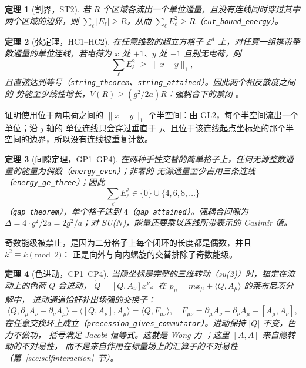 \documentclass[aps,prd,preprint,superscriptaddress,amsmath,amssymb]{revtex4-2}
\newtheorem{theorem}{定理}[section]
\begin{document}
\begin{theorem}[割界，ST2]
若 $R$ 个区域各流出一个单位通量，且没有连线同时穿过其中两个区域的边界，则
$\sum_\ell|E_\ell|\ge R$，从而 $\sum_\ell E_\ell^2\ge R$（\texttt{cut\_bound\_energy}）。
\end{theorem}

\begin{theorem}[弦定理，HC1--HC2]
在任意维数的超立方格子 $\mathbb{Z}^d$ 上，对任意一组携带整数通量的单位连线，若电荷为
$x$ 处 $+1$、$y$ 处 $-1$ 且别无电荷，则
\begin{equation}
\sum_\ell E_\ell^2\;\ge\;\|x-y\|_1 ,
\end{equation}
且直弦达到等号（\texttt{string\_theorem}、\texttt{string\_attained}）。因此两个相反散度之间的
势能至少线性增长，$V(R)\ge(g^2/2a)R$：强耦合下的禁闭 \cite{wilson1974confinement}。
\end{theorem}

证明使用位于两电荷之间的 $\|x-y\|_1$ 个半空间：由 GL2，每个半空间流出一个单位；沿 $j$ 轴的
单位连线只会穿过垂直于 $j$、且位于该连线起点坐标处的那个半空间的边界，所以没有连线被重复计数。

\begin{theorem}[间隙定理，GP1--GP4]
在两种手性交替的简单格子上，任何无源整数通量的能量为偶数（\texttt{energy\_even}）；非零的
无源通量至少占用三条连线（\texttt{energy\_ge\_three}）；因此
\begin{equation}
\sum_\ell E_\ell^2\in\{0\}\cup\{4,6,8,\dots\}
\end{equation}
（\texttt{gap\_theorem}），单个格子达到 $4$（\texttt{gap\_attained}）。强耦合间隙为
$\Delta=4\cdot g^2/2a=2g^2/a$；对 SU($N$)，能量还要乘以连线所带表示的 Casimir 值。
\end{theorem}

奇数能级被禁止，是因为二分格子上每个闭环的长度都是偶数，并且 $k^2\equiv k\pmod 2$：
正是向外与向内螺旋的交替排除了奇数能级。

\begin{theorem}[色进动，CP1--CP4]
当隐坐标是完整的三维转动（su(2)）时，锚定在流动上的色荷 $Q$ 会进动，
$\dot Q=[Q,A_\nu]\dot x^\nu$。在 $p_\mu=m\dot x_\mu+\langle Q,A_\mu\rangle$ 的莱布尼茨分解中，
进动通道恰好补出场强的交换子：
\begin{equation}
\langle Q,\partial_\mu A_\nu-\partial_\nu A_\mu\rangle-\langle[Q,A_\nu],A_\mu\rangle
=\langle Q,F_{\mu\nu}\rangle,\quad
F_{\mu\nu}=\partial_\mu A_\nu-\partial_\nu A_\mu+[A_\mu,A_\nu],
\end{equation}
在任意交换环上成立（\texttt{precession\_gives\_commutator}）。进动保持 $|Q|$ 不变，色力不做功，
括号满足 Jacobi 恒等式。这就是 Wong 力 \cite{wong1970field}；这里 $[A,A]$ 来自隐转动的不对易性，
而不是来自作用在标量场上的汇算子的不对易性（第~\ref{sec:selfinteraction}~节）。
\end{theorem}
\end{document}
